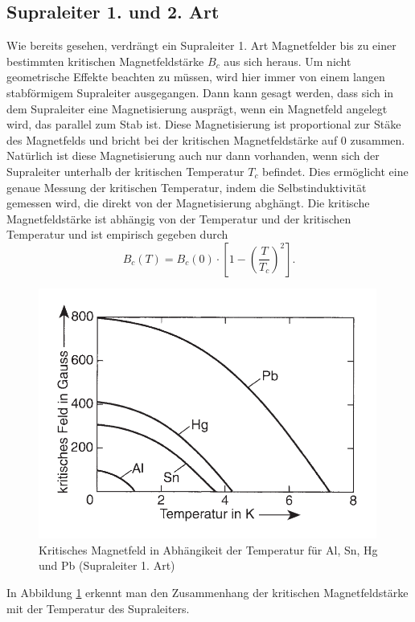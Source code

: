 \subsection{Supraleiter 1. und 2. Art}\label{arten}
Wie bereits gesehen, verdrängt ein Supraleiter 1. Art Magnetfelder bis zu einer bestimmten kritischen Magnetfeldstärke $B_c$ aus sich heraus. Um nicht geometrische Effekte beachten zu müssen, wird hier immer von einem langen stabförmigem Supraleiter ausgegangen. Dann kann gesagt werden, dass sich in dem Supraleiter eine Magnetisierung ausprägt, wenn ein Magnetfeld angelegt wird, das parallel zum Stab ist. Diese Magnetisierung ist proportional zur Stäke des Magnetfelds und bricht bei der kritischen Magnetfeldstärke auf $0$ zusammen. Natürlich ist diese Magnetisierung auch nur dann vorhanden, wenn sich der Supraleiter unterhalb der kritischen Temperatur $T_c$ befindet. Dies ermöglicht eine genaue Messung der kritischen Temperatur, indem die Selbstinduktivität gemessen wird, die direkt von der Magnetisierung abghängt. Die kritische Magnetfeldstärke ist abhängig von der Temperatur und der kritischen Temperatur und ist empirisch gegeben durch
\begin{equation}
 B_c(T)=B_c(0)\cdot \left[1-\left(\frac{T}{T_c}\right)^2\right].
\end{equation}
\begin{figure}[htbp]  
     \includegraphics[width=0.99\textwidth]{1_art.png}
  \caption{Kritisches Magnetfeld in Abhängikeit der Temperatur für Al, Sn, Hg und Pb (Supraleiter 1. Art) \cite{supraleitung}}
  \label{1.art}
\end{figure}
In Abbildung \ref{1.art} erkennt man den Zusammenhang der kritischen Magnetfeldstärke mit der Temperatur des Supraleiters.


